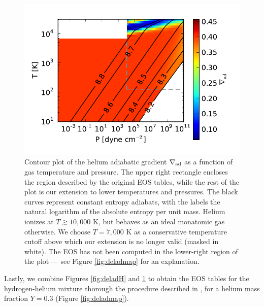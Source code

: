 \documentclass[apj]{emulateapj}
\newcommand{\delad}{\nabla_{\rm ad}}
\begin{document}
\begin{figure}[h!]
\centering
\includegraphics[scale=.8]{../../figs/ModelAtmospheres/RadSelfGravRealEOS/PaperFigs/delad_S_He.pdf}
\caption{Contour plot of the helium adiabatic gradient $\delad$ as a function of gas temperature and pressure. The upper right rectangle encloses the region described by the original \citet{saumon95} EOS tables, while the rest of the plot is our extension to lower temperatures and pressures. The black curves represent constant entropy adiabats, with the labels the natural logarithm of the absolute entropy per unit mass. Helium ionizes at $T \gtrsim 10,000$ K, but behaves as an ideal monatomic gas otherwise. We choose $T=7,000$ K as a conservative temperature cutoff above which our extension is no longer valid (masked in white). The EOS has not been computed in the lower-right region of the plot --- see Figure \ref{fig:deladmap} for an explanation.}
\label{fig:deladHe}
\end{figure}

\vspace{0.2in}

Lastly, we combine Figures \ref{fig:deladH} and \ref{fig:deladHe} to obtain the EOS tables for the hydrogen-helium mixture thorough the procedure described in \citet{saumon95}, for a helium mass fraction $Y=0.3$ (Figure \ref{fig:deladmap}).

\end{document}
